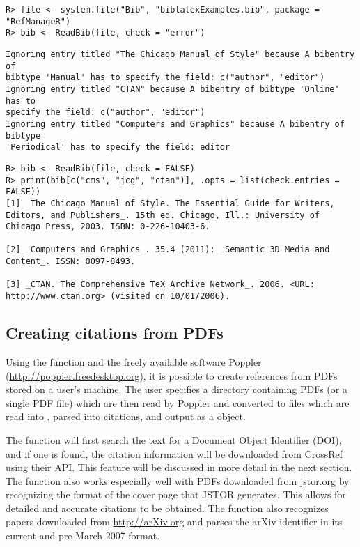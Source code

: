 \documentclass[article]{jss}\usepackage[]{graphicx}\usepackage[]{color}
\makeatletter
\newenvironment{kframe}{%
 \def\at@end@of@kframe{}%
 \ifinner\ifhmode%
  \def\at@end@of@kframe{\end{minipage}}%
  \begin{minipage}{\columnwidth}%
 \fi\fi%
 \def\FrameCommand##1{\hskip\@totalleftmargin \hskip-\fboxsep
 \colorbox{shadecolor}{##1}\hskip-\fboxsep
     \hskip-\linewidth \hskip-\@totalleftmargin \hskip\columnwidth}%
 \MakeFramed {\advance\hsize-\width
   \@totalleftmargin\z@ \linewidth\hsize
   \@setminipage}}%
 {\par\unskip\endMakeFramed%
 \at@end@of@kframe}
\newenvironment{knitrout}{}{} %
\makeatother
\begin{document}
\begin{knitrout}
\color{fgcolor}\begin{kframe}
\begin{verbatim}
R> file <- system.file("Bib", "biblatexExamples.bib", package = "RefManageR")
R> bib <- ReadBib(file, check = "error")
\end{verbatim}
\begin{lstlisting}[style=output]
Ignoring entry titled "The Chicago Manual of Style" because A bibentry of 
bibtype 'Manual' has to specify the field: c("author", "editor")
Ignoring entry titled "CTAN" because A bibentry of bibtype 'Online' has to 
specify the field: c("author", "editor")
Ignoring entry titled "Computers and Graphics" because A bibentry of bibtype
'Periodical' has to specify the field: editor
\end{lstlisting}\begin{verbatim}
R> bib <- ReadBib(file, check = FALSE)
R> print(bib[c("cms", "jcg", "ctan")], .opts = list(check.entries = FALSE))
[1] _The Chicago Manual of Style. The Essential Guide for Writers,
Editors, and Publishers_. 15th ed. Chicago, Ill.: University of
Chicago Press, 2003. ISBN: 0-226-10403-6.

[2] _Computers and Graphics_. 35.4 (2011): _Semantic 3D Media and
Content_. ISSN: 0097-8493.

[3] _CTAN. The Comprehensive TeX Archive Network_. 2006. <URL:
http://www.ctan.org> (visited on 10/01/2006).
\end{verbatim}
\end{kframe}
\end{knitrout}


\subsection{Creating citations from PDFs}
Using the function  and the freely available software Poppler (\url{http://poppler.freedesktop.org}), it is possible to create references from PDFs stored on a user's machine.  The user specifies a directory containing PDFs (or a single PDF file) which are then read by Poppler and converted to  files which are read into \R{}, parsed into citations, and output as a  object.  

The function will first search the text for a Document Object Identifier (DOI), and if one is found, the citation information will be downloaded from CrossRef using their API.  This feature will be discussed in more detail in the next section.  The function also works especially well with PDFs downloaded from \url{jstor.org} by recognizing the format of the cover page that JSTOR generates.  This allows for detailed and accurate citations to be obtained.  The function also recognizes papers downloaded from \url{http://arXiv.org} and parses the arXiv identifier in its current and pre-March 2007 format.
\end{document}
